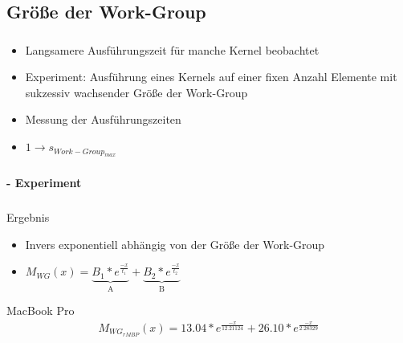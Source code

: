 \documentclass{beamer}
\begin{document}
\subsection{Größe der Work-Group}
\label{sect:model_wgsize}

\begin{frame}
	\frametitle{}
	\framesubtitle{}
	\begin{itemize}
		\item Langsamere Ausführungszeit für manche Kernel beobachtet
		\item Experiment: Ausführung eines Kernels auf einer fixen Anzahl Elemente mit sukzessiv wachsender Größe der Work-Group
		\item Messung der Ausführungszeiten
		\item $1 \rightarrow s_{Work-Group_{max}}$
	\end{itemize}
\end{frame}

\begin{frame}
	\frametitle{}
	\framesubtitle{ - Experiment}
	\begin{figure}[p]
		\begin{center}
		\end{center}
	\end{figure}
\end{frame}

\begin{frame}
	\frametitle{}
	\framesubtitle{}
	\begin{block}{Ergebnis}
		\begin{itemize}
			\item Invers exponentiell abhängig von der Größe der Work-Group
			\item $M_{WG}(x) = \underbrace{B_1*e^{\frac{-x}{t_1}}}_\text{A} + \underbrace{B_2*e^{\frac{-x}{t_2}}}_\text{B}$
		\end{itemize}	
	\end{block}
	\begin{block}{MacBook Pro}
		\begin{gather*}
			M_{WG_{rMBP}}(x) = 13.04 * e^{\frac{-x}{12.21124}} + 26.10 * e^{\frac{-x}{2.28329}}
		\end{gather*}
	\end{block}
\end{frame}
\end{document}
